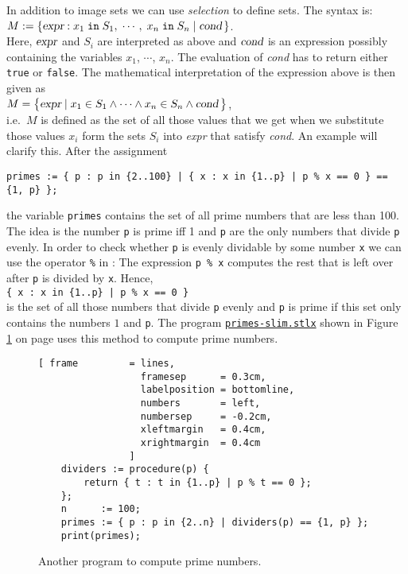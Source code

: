 In addition to image sets we can use \emph{selection} to define sets.
The syntax is: 
\\[0.2cm]
\hspace*{1.3cm}  
$M := \{ \textsl{expr} : x_1 \;\mathtt{in}\; S_1,\; \cdots,\; x_n \;\mathtt{in}\; S_n \mid \textsl{cond}\, \}$. 
\\[0.2cm]
Here,   $\textsl{expr}$ and $S_i$ are interpreted as above and  
 $\textsl{cond}$ is an expression possibly containing the variables  $x_1$, $\cdots$, $x_n$.  The
 evaluation of \textsl{cond} has to return either  \texttt{true} or \texttt{false}.  The
 mathematical interpretation of the expression above is then given as \\[0.2cm]
\hspace*{1.3cm} 
$M = \bigl\{ \textsl{expr} \mid x_1 \in S_1 \wedge \cdots \wedge x_n \in S_n \wedge \textsl{cond}
\,\bigr\}$, 
\\[0.2cm]
i.e.~$M$ is defined as the set of all those values that we get when we substitute those values $x_i$
form the sets $S_i$ into \textsl{expr} that satisfy \textsl{cond}.  An example will clarify this.
After the assignment
\begin{alltt}
  \texttt{primes := \{ p : p in  \{2..100\} | \{ x : x in \{1..p\} | p \% x == 0 \} == \{1, p\} \};}
\end{alltt}
the variable \texttt{primes} contains the set of all prime numbers that are less than 100.
The idea is the number \texttt{p} is prime iff 1 and \texttt{p} are the only numbers that divide
\texttt{p} evenly.  In order to check whether \texttt{p} is evenly dividable by some number
\texttt{x} we can use the operator \texttt{\%}
in \setl: The expression \texttt{p \% x}
computes the rest that is left over after \texttt{p} is divided by \texttt{x}.
Hence,
\\[0.2cm]
\hspace*{1.3cm} 
\texttt{\{ x : x in \{1..p\} | p \% x == 0 \}}
\\[0.2cm]
is the set of all those numbers that divide \texttt{p} evenly and \texttt{p} is prime if this set
only contains the numbers  $1$ and \texttt{p}.  The program
\href{https://github.com/karlstroetmann/Logik/blob/master/SetlX/primes-slim.stlx}{\texttt{primes-slim.stlx}}
shown in Figure
\ref{fig:primes-slim.stlx} on page \pageref{fig:primes-slim.stlx} uses this method to compute prime numbers.


\begin{figure}[!ht]
  \centering
\begin{Verbatim}[ frame         = lines, 
                  framesep      = 0.3cm, 
                  labelposition = bottomline,
                  numbers       = left,
                  numbersep     = -0.2cm,
                  xleftmargin   = 0.4cm,
                  xrightmargin  = 0.4cm
                ]
    dividers := procedure(p) {
        return { t : t in {1..p} | p % t == 0 };
    };
    n      := 100;
    primes := { p : p in {2..n} | dividers(p) == {1, p} };
    print(primes);
\end{Verbatim} 
\vspace*{-0.3cm}
\caption{Another program to compute prime numbers.  \label{fig:primes-slim.stlx}}
\end{figure} 

